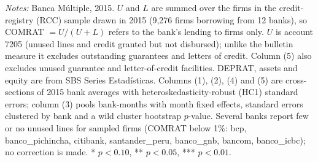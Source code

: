 \begin{table}[!h]
\begin{threeparttable}[b]
      \begin{tablenotes}\item \textit{Notes:} Banca M\'ultiple, 2015. $U$ and $L$ are summed over the firms in the credit-registry (RCC) sample drawn in 2015 (9,276 firms borrowing from 12 banks), so COMRAT $= U/(U+L)$ refers to the bank's lending to firms only. $U$ is account 7205 (unused lines and credit granted but not disbursed); unlike the bulletin measure it excludes outstanding guarantees and letters of credit. Column (5) also excludes unused guarantee and letter-of-credit facilities. DEPRAT, assets and equity are from SBS Series Estad\'isticas. Columns (1), (2), (4) and (5) are cross-sections of 2015 bank averages with heteroskedasticity-robust (HC1) standard errors; column (3) pools bank-months with month fixed effects, standard errors clustered by bank and a wild cluster bootstrap $p$-value. Several banks report few or no unused lines for sampled firms (COMRAT below 1\%: bcp, banco\_pichincha, citibank, santander\_peru, banco\_gnb, bancom, banco\_icbc); no correction is made. * $p<0.10$, ** $p<0.05$, *** $p<0.01$.
      \end{tablenotes}
   \end{threeparttable}
\end{table}


